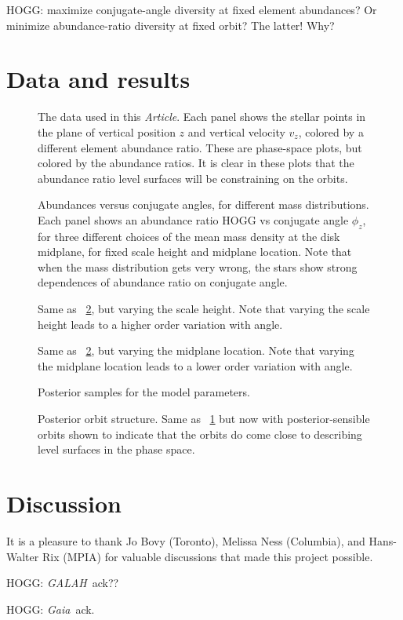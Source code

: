 \documentclass[modern]{aastex62}
\newcommand{\documentname}{\textsl{Article}}
\newcommand{\acronym}[1]{{\small{#1}}}
\newcommand{\project}[1]{\textsl{#1}}
\newcommand{\galah}{\project{\acronym{GALAH}}}
\newcommand{\gaia}{\project{Gaia}}
\begin{document}
HOGG: maximize conjugate-angle diversity at fixed element abundances?
Or minimize abundance-ratio diversity at fixed orbit? The latter! Why?

\section{Data and results}

\begin{figure}
\caption{The data used in this \documentname. Each panel shows the stellar points in the
plane of vertical position $z$ and vertical velocity $v_z$, colored by a different element
abundance ratio. These are phase-space plots, but colored by the abundance ratios.
It is clear in these plots that the abundance ratio level surfaces will be
constraining on the orbits.\label{fig:data}}
\end{figure}

\begin{figure}
\caption{Abundances versus conjugate angles, for different mass distributions.
Each panel shows an abundance ratio HOGG vs conjugate angle $\phi_z$, for three different
choices of the mean mass density at the disk midplane, for fixed scale height and midplane
location. Note that when the mass distribution gets very wrong, the stars show strong
dependences of abundance ratio on conjugate angle.\label{fig:density}}
\end{figure}

\begin{figure}
\caption{Same as \figurename~\ref{fig:density}, but varying the scale height. Note that
varying the scale height leads to a higher order variation with angle.\label{fig:scaleheight}}
\end{figure}

\begin{figure}
\caption{Same as \figurename~\ref{fig:density}, but varying the midplane location. Note
that varying the midplane location leads to a lower order variation with angle.\label{fig:midplane}}
\end{figure}

\begin{figure}
\caption{Posterior samples for the model parameters.\label{fig:samples}}
\end{figure}

\begin{figure}
\caption{Posterior orbit structure. Same as \figurename~\ref{fig:data} but now with
posterior-sensible orbits shown to indicate that the orbits do come close to describing
level surfaces in the phase space.}
\end{figure}

\section{Discussion}

\acknowledgements
It is a pleasure to thank
  Jo Bovy (Toronto), 
  Melissa Ness (Columbia),
  and
  Hans-Walter Rix (\acronym{MPIA})
for valuable discussions that made this project possible.

HOGG: \galah\ ack??

HOGG: \gaia\ ack.


\end{document}

